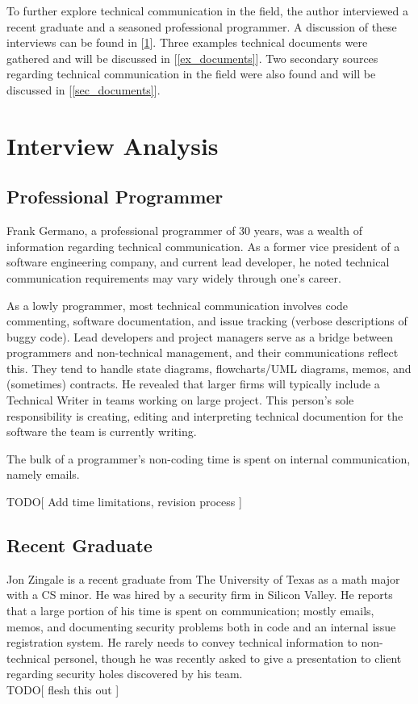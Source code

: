 \documentclass[prodmode,acmtecs]{acmsmall} %
\begin{document}
To further explore technical communication in the field, the author interviewed a recent graduate and a seasoned professional programmer.  A discussion of these interviews can be found in [\ref{interviews}].  Three examples technical documents were gathered and will be discussed in [\ref{ex_documents}].  Two secondary sources regarding technical communication in the field were also found and will be discussed in [\ref{sec_documents}].

\section{Interview Analysis}\label{interviews}

\subsection{Professional Programmer}
Frank Germano, a professional programmer of 30 years, was a wealth of information regarding technical communication.  As a former vice president of a software engineering company, and current lead developer, he noted technical communication requirements may vary widely through one's career. 

As a lowly programmer, most technical communication involves code commenting, software documentation, and issue tracking (verbose descriptions of buggy code).  Lead developers and project managers serve as a bridge between programmers and non-technical management, and their communications reflect this.  They tend to handle state diagrams, flowcharts/UML diagrams, memos, and (sometimes) contracts.  He revealed that larger firms will typically include a Technical Writer in teams working on large project.  This person's sole responsibility is creating, editing and interpreting technical documention for the software the team is currently writing. 

The bulk of a programmer's non-coding time is spent on internal communication, namely emails.

TODO[ Add time limitations, revision process ]

\subsection{Recent Graduate}
Jon Zingale is a recent graduate from The University of Texas as a math major with a CS minor.  He was hired by a security firm in Silicon Valley.  He reports that a large portion of his time is spent on communication; mostly emails, memos, and documenting security problems both in code and an internal issue registration system.  He rarely needs to convey technical information to non-technical personel, though he was recently asked to give a presentation to client regarding security holes discovered by his team.  \\
TODO[ flesh this out ]
\end{document}
